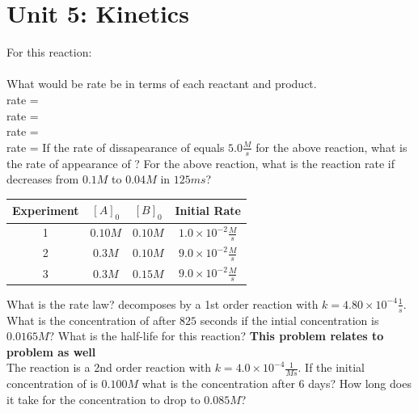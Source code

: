 \documentclass{article}
\begin{document}
\section{Unit 5: Kinetics}
\ProblemSet
For this reaction: \\
 \\
What would be rate be in terms of each reactant and product. \\
 \hspace{0.5em} rate = \\
 \hspace{0.5em} rate = \\
 \hspace{0.5em} rate = \\
 \hspace{0.5em} rate = 
\ProblemSet
If the rate of dissapearance of  equals \(5.0\frac{M}{s}\) for the above reaction, what is the rate of appearance of ?
\ProblemSet
For the above reaction, what is the reaction rate if  decreases from \(0.1M\) to \(0.04M\) in \(125ms\)?
\ProblemSet
{}
\begin{center}
    \begin{tabular}{||c c c c||} 
     \hline
     Experiment & \([A]_0\) & \([B]_0\) & Initial Rate \\ [0.5ex] 
     \hline\hline
     1 & \(0.10M\) & \(0.10M\) & \(1.0 \times 10^{-2}\frac{M}{s}\) \\ [1ex]
     \hline
     2 & \(0.3M\) & \(0.10M\) & \(9.0 \times 10^{-2}\frac{M}{s}\) \\[1ex]
     \hline
     3 & \(0.3M\) & \(0.15M\) & \(9.0 \times 10^{-2} \frac{M}{s}\) \\ [1ex] 
     \hline
    \end{tabular}
\end{center}
What is the rate law?
\ProblemSet
{} decomposes by a 1st order reaction with \(k = 4.80 \times 10^{-4} \frac{1}{s}\). What is the concentration of  after \(825\) seconds if the 
intial concentration is \(0.0165M\)? What is the half-life for this reaction?
\ProblemSet
\textbf{This problem relates to problem \theyayCounter{} as well }\\
The reaction  is a 2nd order reaction with \(k = 4.0 \times 10^{-4}\frac{1}{Ms}\). If the initial concentration of  is
\(0.100M\) what is the concentration after 6 days?
\ProblemSet
How long does it take for the concentration to drop to \(0.085M\)?
\end{document}
